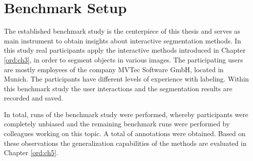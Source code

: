 
\chapter{Benchmark Setup}\label{ord:ch4}

The established benchmark study is the centerpiece of this thesis and serves as main instrument to obtain insights about interactive segmentation methods.
In this study real participants apply the interactive methods introduced in Chapter \ref{ord:ch3}, in order to segment objects in various images.
The participating users are mostly employees of the company MVTec Software GmbH, located in Munich.
The participants have different levels of experience with labeling.
Within this benchmark study the user interactions and the segmentation results are recorded and saved.

In total, \getNumberBenchmarkRuns runs of the benchmark study were performed, whereby \getNumberBenchmarkParticipants participants were completely unbiased and the remaining benchmark runs were performed by colleagues working on this topic.
A total of \getNumberBenchmarkAnnotations annotations were obtained.
Based on these observations the generalization capabilities of the methods are evaluated in Chapter \ref{ord:ch5}.





